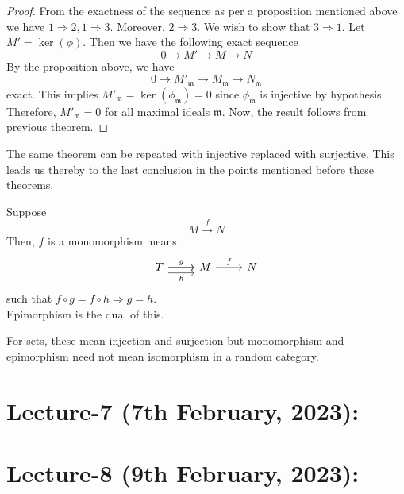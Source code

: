 \documentclass[oneside, 12pt, ]{scrbook}
\newcommand{\m}{\mathfrak{m}}
\theoremstyle{theorem}
\begin{document}
\begin{proof}
From the exactness of the sequence as per a proposition mentioned above we have $1 \Rightarrow 2, 1 \Rightarrow 3$. Moreover, $2 \Rightarrow 3$. We wish to show that $3 \Rightarrow 1$. Let $M' = \ker (\phi)$. Then we have the following exact sequence $$0 \rightarrow M' \rightarrow M \rightarrow N $$ By the proposition above, we have $$0 \rightarrow M'_{\m} \rightarrow M_{\m} \rightarrow N_{\m} $$ exact. This implies $M'_{\m} = \ker (\phi_{\m}) = 0$ since $\phi_{\m}$ is injective by hypothesis. Therefore, $M'_{\m} = 0$ for all maximal ideals $\m$. Now, the result follows from previous theorem.
\end{proof}

The same theorem can be repeated with injective replaced with surjective. This leads us thereby to the last conclusion in the points mentioned before these theorems.
\begin{definition}
Suppose $$M \xrightarrow{f} N$$ Then, $f$ is a monomorphism means 
\[\begin{tikzcd}
	T & M & N
	\arrow["f", from=1-2, to=1-3]
	\arrow["g", from=1-1, to=1-2]
	\arrow[from=1-1, to=1-2]
	\arrow["h"', shift right=2, from=1-1, to=1-2]
\end{tikzcd}\] such that $f\circ g = f\circ h \Rightarrow g=h$. \\

Epimorphism is the dual of this.
\end{definition}

\begin{remark}
For sets, these mean injection and surjection but monomorphism and epimorphism need not mean isomorphism in a random category. 
\end{remark}

\chapter{Lecture-7 (7th February, 2023): }









\chapter{Lecture-8 (9th February, 2023): }
\end{document}
